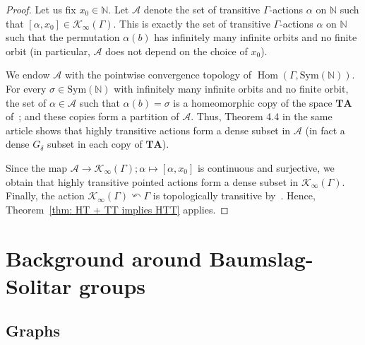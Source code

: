 \documentclass[12pt]{article}
\numberwithin{equation}{section}
\theoremstyle{definition}
\newcommand{\N}{\mathbb{N}}
\newcommand{\Ac}{\mathcal{A}}
\newcommand{\PK}{\mathcal{K}}
\newcommand\BSo{\mathrm{BS}}
\newcommand{\Sym}{\mathrm{Sym}}
\newcommand\Tree{\mathcal{T}}
\begin{document}
\begin{proof}
	Let us fix \( x_0 \in \N \).
	Let \( \Ac \) denote the set of transitive \( \Gamma \)-actions \( \alpha \) on \( \N \)
	such that \([\alpha, x_0] \in \PK_\infty(\Gamma)\).
	This is exactly the set of transitive \( \Gamma \)-actions \( \alpha \) on \( \N \)
	such that the permutation \(\alpha(b)\) has infinitely many infinite orbits and no finite orbit (in particular, \( \Ac \) does not depend on the choice of \( x_0 \)).

    
	We endow \( \Ac \) with the pointwise convergence topology of \( \operatorname{Hom}(\Gamma, \Sym(\N)) \). 
	For every \(\sigma\in \Sym(\N)\) with infinitely many infinite orbits and no finite orbit, 
	the set of \( \alpha\in\Ac \) such that \(\alpha(b)=\sigma\) is a homeomorphic copy of the space \(\mathbf{TA}\) of~\cite[Definition~4.2]{fima_characterization_HT_2022}; 
	and these copies form a partition of \( \Ac \).
	Thus, Theorem 4.4 in the same article shows that highly transitive actions form a dense subset in \( \Ac \)
	(in fact a dense \( G_\delta \) subset in each copy of \(\mathbf{TA}\)).

	Since the map \(\Ac \to \PK_\infty(\Gamma); \alpha \mapsto [\alpha, x_0]\) is continuous and surjective,
	we obtain that
	highly transitive pointed actions form a dense subset in \(\PK_\infty(\Gamma)\).
	Finally, the action \( \PK_\infty(\Gamma) \curvearrowleft \Gamma \) is topologically transitive by~\cite[Theorem~B]{CGLMS-22}.
	Hence, Theorem~\ref{thm: HT + TT implies HTT} applies.
\end{proof}

\section{Background around Baumslag-Solitar groups}



\subsection{Graphs} 
\end{document}
